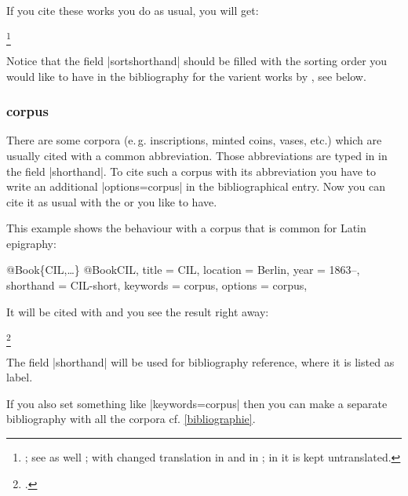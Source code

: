 \documentclass[a4paper,
10pt,
greek,
french,
spanish,
italian,
ngerman,
english,
]{ltxdoc}
\begin{document}
If you cite these works you do as usual, you will get:
\begin{example}
\footnote{\cite[1,1,2]{Vitr}; see as well \cite{Vitr:Loeb}; with changed translation in \cite{Vitr:Krohn} and in \cite{Vitr:Saliou}; in \cite{Vitr:Fischer} it is kept untranslated.}
\end{example}


\begin{marker}
Notice that the field |sortshorthand| should be filled with the sorting order you would like to have in the bibliography for the varient works by \citeauthor{Vitr}, see below.
\end{marker}



\subsubsection{corpus}\label{corpus}
There are some corpora (e.\,g. inscriptions, minted coins, vases, etc.) which are usually cited with a common abbreviation. 
Those abbreviations are typed in in the field |shorthand|.
To cite such a corpus with its abbreviation you have to write an additional |options={corpus}| in the bibliographical entry.
Now you can cite it as usual with the  or  you like to have.

This example shows the behaviour with a corpus that is common for Latin epigraphy:
\begin{bibexample}[label=CIL]{{@}Book\{CIL,…\}}
@Book{CIL,
  title     = CIL, %
  location  = Berlin, %
  year      = {1863--},
  shorthand = CIL-short,  %
  keywords  = {corpus}, %
  options   = {corpus},
}
\end{bibexample}

It will be cited with and you see the result right away:
\begin{example}
\footnote{\cite[06, 01234]{CIL}.}
\end{example}

The field |shorthand| will be used for bibliography reference,
where it is listed as label.

If you also set something like |keywords={corpus}| then you can make a separate bibliography with all the corpora cf. \cref{bibliographie}.

\end{document}
